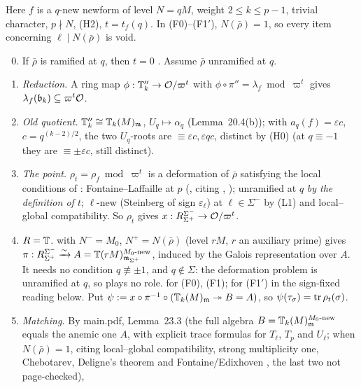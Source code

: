 \begin{outline}
Here $f$ is a $q$-new newform of level $N=qM$, weight $2\le k\le p-1$, trivial character, $p\nmid N$, (H2), $t=t_f(q)$. In (F0)--(F1$'$),
$N(\bar\rho)=1$, so every item concerning $\ell\mid N(\bar\rho)$ is void.
\begin{enumerate}[label=(\arabic*)]
\setcounter{enumi}{-1}
\item If $\bar\rho$ is ramified at $q$, then $t=0$ \cite[Def.~2.12]{KO} \stcited. Assume $\bar\rho$ unramified at $q$.
\item \emph{Reduction.} A ring map $\phi:\mathbb{T}''_k\to\mathcal{O}/\varpi^t$ with $\phi\circ\pi''=\lambda_f\bmod\varpi^t$ gives $\lambda_f(\mathfrak{b}_k)\subseteq\varpi^t\mathcal{O}$. \stproved
\item \emph{Old quotient.} $\mathbb{T}''_k\cong\mathbb{T}_k(M)_{\mathfrak{m}}$, $U_q\mapsto\alpha_q$ (Lemma~20.4(b)); with $a_q(f)=\varepsilon c$, $c=q^{(k-2)/2}$, the two
  $U_q$-roots are $\equiv\varepsilon c,\varepsilon qc$, distinct by (H0) (at $q\equiv-1$ they are $\equiv\pm\varepsilon c$, still distinct). \stpmc
\item \emph{The point.} $\rho_t=\rho_f\bmod\varpi^t$ is a deformation of $\bar\rho$ satisfying the local conditions of \cite[Def.~3.9]{KO}:
  Fontaine--Laffaille at $p$ (\cite[\S3.2.1]{KO}, citing \cite{DFG}, \stcited); unramified at $q$ \emph{by the definition of $t$}; $\ell$-new
  (Steinberg of sign $\varepsilon_\ell$) at $\ell\in\Sigma^-$ by (L1) and local--global compatibility. So $\rho_t$ gives
  $x:R^{\Sigma^-}_{\Sigma^+}\to\mathcal{O}/\varpi^t$. \stpmc
\item \emph{$R=\mathbb{T}$.} \cite[Thm~3.14, p.~12]{KO} with $N^-=M_0$, $N^+=N(\bar\rho)$ (level $rM$, $r$ an auxiliary prime) gives
  $\pi:R^{\Sigma^-}_{\Sigma^+}\xrightarrow{\sim}A=\mathbb{T}(rM)^{M_0\text{-new}}_{\mathfrak{m}_{\Sigma^+}}$, induced by the Galois representation over $A$. It needs no
  condition $q\not\equiv\pm1$, and $q\notin\Sigma$: the deformation problem is unramified at $q$, so \cite[Prop.~2.15(1)]{KO} plays no role.
  \stcited{} for (F0), (F1); for (F1$'$) \stpmc{} in the sign-fixed reading below. Put
  $\psi:=x\circ\pi^{-1}\circ(\mathbb{T}_k(M)_{\mathfrak{m}}\twoheadrightarrow B=A)$, so $\psi(\tau_\sigma)=\operatorname{tr}\rho_t(\sigma)$.
\item \emph{Matching.} By main.pdf, Lemma~23.3 (the full algebra $B=\mathbb{T}_k(M)^{M_0\text{-new}}_{\mathfrak{m}}$ equals the anemic one $A$, with explicit
  trace formulas for $T_\ell$, $T_p$ and $U_\ell$; \stpmc{} when $N(\bar\rho)=1$, citing local--global compatibility, strong multiplicity
  one, Chebotarev, Deligne's theorem \cite[Thm~2.5]{Edi92} and Fontaine/Edixhoven \cite[Thm~2.6]{Edi92}, the last two not page-checked),

\end{enumerate}
\end{outline}

